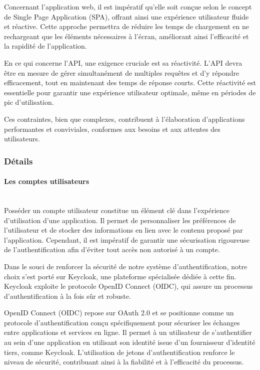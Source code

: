 Concernant l'application web, il est impératif qu'elle soit conçue selon le concept de Single Page Application (SPA), offrant ainsi une expérience utilisateur fluide et réactive. Cette approche permettra de réduire les temps de chargement en ne rechargeant que les éléments nécessaires à l'écran, améliorant ainsi l'efficacité et la rapidité de l'application.

En ce qui concerne l'API, une exigence cruciale est sa réactivité. L'API devra être en mesure de gérer simultanément de multiples requêtes et d'y répondre efficacement, tout en maintenant des temps de réponse courts. Cette réactivité est essentielle pour garantir une expérience utilisateur optimale, même en périodes de pic d'utilisation.

Ces contraintes, bien que complexes, contribuent à l'élaboration d'applications performantes et conviviales, conformes aux besoins et aux attentes des utilisateurs.


\subsubsection{Détails}

\paragraph{Les comptes utilisateurs}
~~\\

Posséder un compte utilisateur constitue un élément clé dans l'expérience d'utilisation d'une application. Il permet de personnaliser les préférences de l'utilisateur et de stocker des informations en lien avec le contenu proposé par l'application. Cependant, il est impératif de garantir une sécurisation rigoureuse de l'authentification afin d'éviter tout accès non autorisé à un compte.

Dans le souci de renforcer la sécurité de notre système d'authentification, notre choix s'est porté sur Keycloak, une plateforme spécialisée dédiée à cette fin. Keycloak exploite le protocole OpenID Connect (OIDC), qui assure un processus d'authentification à la fois sûr et robuste.

OpenID Connect (OIDC) repose sur OAuth 2.0 et se positionne comme un protocole d'authentification conçu spécifiquement pour sécuriser les échanges entre applications et services en ligne. Il permet à un utilisateur de s'authentifier au sein d'une application en utilisant son identité issue d'un fournisseur d'identité tiers, comme Keycloak. L'utilisation de jetons d'authentification renforce le niveau de sécurité, contribuant ainsi à la fiabilité et à l'efficacité du processus.

